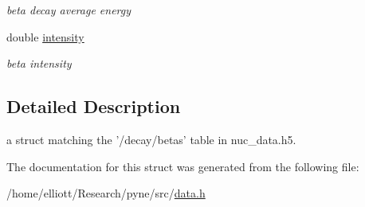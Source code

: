 \begin{DoxyCompactItemize}
\begin{DoxyCompactList}\small\item\em beta decay average energy \end{DoxyCompactList}\item 
\hypertarget{structpyne_1_1beta_a9c2cd5b0d491324940bdd68bde23113a}{double \hyperlink{structpyne_1_1beta_a9c2cd5b0d491324940bdd68bde23113a}{intensity}}\label{structpyne_1_1beta_a9c2cd5b0d491324940bdd68bde23113a}

\begin{DoxyCompactList}\small\item\em beta intensity \end{DoxyCompactList}\end{DoxyCompactItemize}


\subsection{Detailed Description}
a struct matching the '/decay/betas' table in nuc\-\_\-data.\-h5. 

The documentation for this struct was generated from the following file\-:\begin{DoxyCompactItemize}
\item 
/home/elliott/\-Research/pyne/src/\hyperlink{data_8h}{data.\-h}\end{DoxyCompactItemize}
